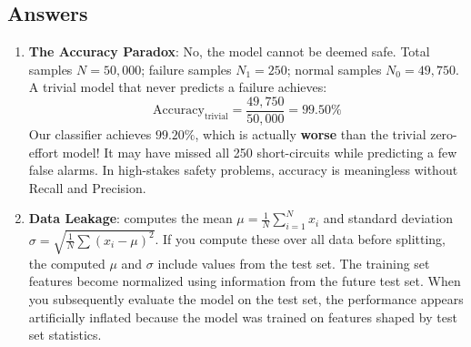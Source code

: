 \subsection*{Answers}

\begin{enumerate}
    \item \textbf{The Accuracy Paradox}:
    No, the model cannot be deemed safe. 
    Total samples $N = 50{,}000$; failure samples $N_1 = 250$; normal samples $N_0 = 49{,}750$. 
    A trivial model that never predicts a failure achieves:
    \begin{equation*}
    \text{Accuracy}_{\text{trivial}} = \frac{49{,}750}{50{,}000} = \mathbf{99.50\%}
    \end{equation*}
    Our classifier achieves $99.20\%$, which is actually \textbf{worse} than the trivial zero-effort model! It may have missed all 250 short-circuits while predicting a few false alarms. In high-stakes safety problems, accuracy is meaningless without Recall and Precision.

    \item \textbf{Data Leakage}:
     computes the mean $\mu = \frac{1}{N}\sum_{i=1}^N x_i$ and standard deviation $\sigma = \sqrt{\frac{1}{N}\sum (x_i - \mu)^2}$. 
    If you compute these over all data before splitting, the computed $\mu$ and $\sigma$ include values from the test set. The training set features become normalized using information from the future test set. When you subsequently evaluate the model on the test set, the performance appears artificially inflated because the model was trained on features shaped by test set statistics.


\end{enumerate}
